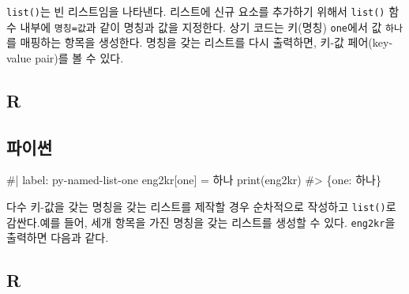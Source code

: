 \documentclass[
  letterpaper,
]{book}
\newenvironment{Shaded}{\begin{snugshade}}{\end{snugshade}}
\newcommand{\NormalTok}[1]{\textcolor[rgb]{0.00,0.23,0.31}{#1}}
\begin{document}
\texttt{list()}는 빈 리스트임을 나타낸다. 리스트에 신규 요소를 추가하기
위해서 \texttt{list()} 함수 내부에
\texttt{\textquotesingle{}명칭\textquotesingle{}=\textquotesingle{}값\textquotesingle{}}과
같이 명칭과 값을 지정한다. 상기 코드는 키(명칭)
\texttt{\textquotesingle{}one\textquotesingle{}}에서 값
\texttt{\textquotesingle{}하나\textquotesingle{}}를 매핑하는 항목을
생성한다. 명칭을 갖는 리스트를 다시 출력하면, 키-값 페어(key-value
pair)를 볼 수 있다.

\subsection{R}

\begin{Shaded}
\end{Shaded}

\subsection{파이썬}

\begin{Shaded}
\begin{Highlighting}[]
\NormalTok{\#| label: py{-}named{-}list{-}one}
\NormalTok{eng2kr[\textquotesingle{}one\textquotesingle{}] = \textquotesingle{}하나\textquotesingle{}}
\NormalTok{print(eng2kr)}
\NormalTok{\#\textgreater{} \{\textquotesingle{}one\textquotesingle{}: \textquotesingle{}하나\textquotesingle{}\}}
\end{Highlighting}
\end{Shaded}

다수 키-값을 갖는 명칭을 갖는 리스트를 제작할 경우 순차적으로 작성하고
\texttt{list()}로 감싼다.예를 들어, 세개 항목을 가진 명칭을 갖는
리스트를 생성할 수 있다. \texttt{eng2kr}을 출력하면 다음과 같다.

\subsection{R}
\end{document}
